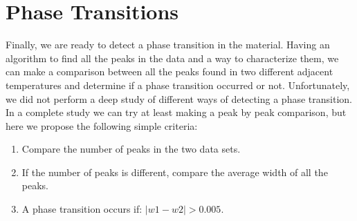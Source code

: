 

\section{Phase Transitions} \label{DefineTransition}
	Finally, we are ready to detect a phase transition in the material. Having an algorithm to find all the peaks in the data and a way to characterize them, we can make a comparison between all the peaks found in two different adjacent temperatures and determine if a phase transition occurred or not.
	Unfortunately, we did not perform a deep study of different ways of detecting a phase transition. In a complete study we can try at least making a peak by peak comparison, but here we propose the following simple criteria:
	\begin{enumerate}
	\item Compare the number of peaks in the two data sets. 
	\item If the number of peaks is different, compare the average width of all the peaks.
	\item A phase transition occurs if: $|w1 - w2| > 0.005$.
	\end{enumerate}
	
	